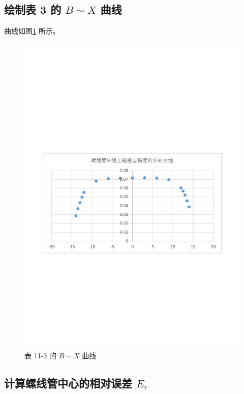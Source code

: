 \documentclass[12pt]{article}
\begin{document}
\subsection{\normalfont 绘制表 3 的 $B\sim X $ 曲线}

曲线如图\ref{fig:table_data3_figure} 所示。

\begin{figure}[H] %
    \centering
    \includegraphics[width=\textwidth]{./figures/图.pdf} 
    \caption{表 11-3 的 $B\sim X $ 曲线}
    \label{fig:table_data3_figure}
\end{figure}

\subsection{\normalfont 计算螺线管中心的相对误差 $E_r$}
\end{document}
